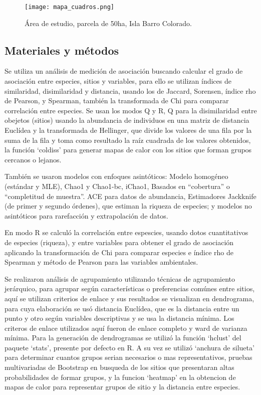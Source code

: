 \documentclass[11pt,]{article}
\begin{document}
\begin{figure}
\centering
\texttt{[image: mapa\_cuadros.png]}
\caption{Área de estudio, parcela de 50ha, Isla Barro Colorado.
\label{fig:mapa_cuadros}}
\end{figure}

\subsection{Materiales y métodos}\label{materiales-y-muxe9todos}

Se utiliza un análisis de medición de asociación buscando calcular el
grado de asociación entre especies, sitios y variables, para ello se
utilizan índices de similaridad, disimilaridad y distancia, usando los
de Jaccard, Sorensen, índice rho de Pearson, y Spearman, también la
transformada de Chi para comparar correlación entre especies. Se usan
los modos Q y R, Q para la disimilaridad entre obejetos (sitios) usando
la abundancia de individuos en una matriz de distancia Euclídea y la
transformada de Hellinger, que divide los valores de una fila por la
suma de la fila y toma como resultado la raíz cuadrada de los valores
obtenidos, la función `coldiss' para generar mapas de calor con los
sitios que forman grupos cercanos o lejanos.

También se usaron modelos con enfoques asintóticos: Modelo homogéneo
(estándar y MLE), Chao1 y Chao1-bc, iChao1, Basados en ``cobertura'' o
``completitud de muestra''. ACE para datos de abundancia, Estimadores
Jackknife (de primer y segundo órdenes), que estiman la riqueza de
especies; y modelos no asintóticos para rarefacción y extrapolación de
datos.

En modo R se calculó la correlación entre espescies, usando dotos
cuantitativos de especies (riqueza), y entre variables para obtener el
grado de asociación aplicando la transformación de Chi para comparar
especies e índice rho de Spearman y método de Pearson para las variables
ambientales.

Se realizaron análisis de agrupamiento utilizando técnicas de
agrupamiento jerárquico, para agrupar según características o
preferencias comúnes entre sitios, aquí se utilizan criterios de enlace
y sus resultados se visualizan en dendrograma, para cuya elaboración se
usó distancia Euclídea, que es la distancia entre un punto y otro según
variables descriptivas y se usa la distancia mínima. Los criteros de
enlace utilizados aquí fueron de enlace completo y ward de varianza
mínima. Para la generación de dendrogramas se utilizó la función
`hclust' del paquete `stats', presente por defecto en R. A su vez se
utilizó `anchura de silueta' para determinar cuantos grupos serian
necesarios o mas representativos, pruebas multivariadas de Bootstrap en
busqueda de los sitios que presentaran altas probabilidades de formar
grupos, y la funcion `heatmap' en la obtencion de mapas de calor para
representar grupos de sitio y la distancia entre especies.
\end{document}

